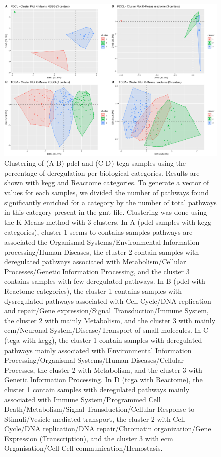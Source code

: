 \begin{figure}
    \begin{center}
        \includegraphics[width=\textwidth]{img/plot_cluster}
        \caption{
            Clustering of (A-B) \acrshort{pdcl} and (C-D) \acrshort{tcga} samples using the percentage of deregulation per biological categories.
            Results are shown with \acrshort{kegg} and Reactome categories.
            To generate a vector of values for each samples, we divided the number of pathways found significantly enriched for a category by the number of total pathways in this category present in the \acrshort{gmt} file.
            Clustering was done using the K-Means method with 3 clusters.
            In A (\acrshort{pdcl} samples with \acrshort{kegg} categories), cluster 1 seems to contains samples pathways are associated the Organismal Systems/Environmental Information processing/Human Diseases, the cluster 2 contain samples with deregulated pathways associated with Metabolism/Cellular Processes/Genetic Information Processing, and the cluster 3 contains samples with few deregulated pathways.
            In B (\acrshort{pdcl} with Reactome categories), the cluster 1 contains samples with dysregulated pathways associated with Cell-Cycle/DNA replication and repair/Gene expression/Signal Transduction/Immune System, the cluster 2 with mainly Metabolism, and the cluster 3 with mainly \acrshort{ecm}/Neuronal System/Disease/Transport of small molecules.
            In C (\acrshort{tcga} with \acrshort{kegg}), the cluster 1 contain samples with deregulated pathways mainly associated with Environmental Information Processing/Organismal Systems/Human Diseases/Cellular Processes, the cluster 2 with Metabolism, and the cluster 3 with Genetic Information Processing.
            In D (\acrshort{tcga} with Reactome), the cluster 1 contain samples with deregulated pathways mainly associated with Immune System/Programmed Cell Death/Metabolism/Signal Transduction/Cellular Response to Stimuli/Vesicle-mediated transport, the cluster 2 with Cell-Cycle/DNA replication/DNA repair/Chromatin organization/Gene Expression (Transcription), and the cluster 3 with \acrlong{ecm} Organisation/Cell-Cell communication/Hemostasis.
        }
        \label{fig:cluster-plot}
    \end{center}
\end{figure}

